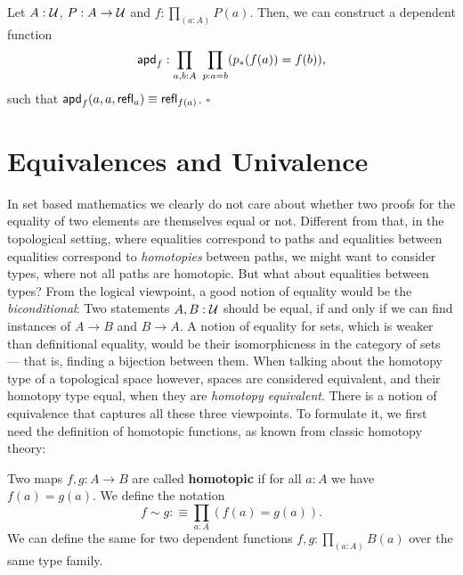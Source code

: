 \begin{lemma} \label{thm:apd-hott}
Let $A : \mathcal{U}$, $P : A \to \mathcal{U}$ and $f : \prod_{(a : A)} P(a)$. Then, we can construct
a dependent function
\begin{equation*}
\mathsf{apd}_f : \prod_{a, b : A} ~ \prod_{p : a = b} (p_*(f(a)) = f(b)) \text{,}
\end{equation*}
such that $\mathsf{apd}_f(a, a, \mathsf{refl}_a) \equiv \mathsf{refl}_{f(a)}$. \hfill $\square$
\end{lemma}

\section{Equivalences and Univalence}

In set based mathematics we clearly do not care about whether two proofs for the
equality of two elements are themselves equal or not.
Different from that, in the topological setting, where equalities correspond to
paths and equalities between equalities correspond to \emph{homotopies} between
paths, we might want to consider types, where not all paths are homotopic.
But what about equalities between types?
From the logical viewpoint, a good notion of equality would be the \emph{biconditional}:
Two statements $A, B : \mathcal{U}$ should be equal, if and only if we can find
instances of $A \to B$ and $B \to A$.
A notion of equality for sets, which is weaker than definitional equality, would
be their isomorphicness in the category of sets --- that is, finding a bijection
between them.
When talking about the homotopy type of a topological space however, spaces are
considered equivalent, and their homotopy type equal, when they are \emph{homotopy
equivalent}.
There is a notion of equivalence that captures all these three viewpoints.
To formulate it, we first need the definition of homotopic functions, as known
from classic homotopy theory:

\begin{defn} \label{def:htpy-hott}
Two maps $f, g : A \to B$ are called \textbf{homotopic} if for all $a : A$ we have
$f(a) = g(a)$.
We define the notation
\begin{equation*}
f \sim g :\equiv \prod_{a : A} (f(a) = g(a)) \text{.}
\end{equation*}
We can define the same for two dependent functions $f, g : \prod_{(a : A)} B(a)$
over the same type family.
\end{defn}

